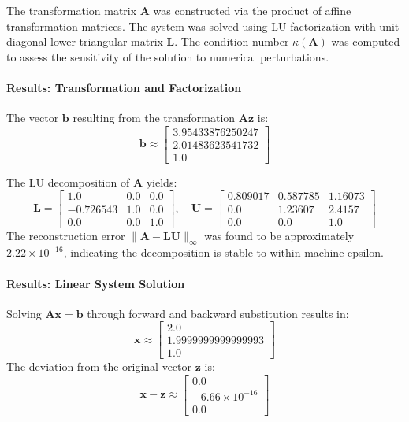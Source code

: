 \begin{solution}

	The transformation matrix $\mathbf{A}$ was constructed via the product of
	affine transformation matrices. The system was solved using LU factorization
	with unit-diagonal lower triangular matrix $\mathbf{L}$. The condition number
	$\kappa(\mathbf{A})$ was computed to assess the sensitivity of the solution to
	numerical perturbations.

	\paragraph{Results: Transformation and Factorization}
	The vector $\mathbf{b}$ resulting from the transformation
	$\mathbf{A}\mathbf{z}$ is:
	\[
		\mathbf{b} \approx \begin{bmatrix}
			3.95433876250247 \\
			2.01483623541732 \\
			1.0
		\end{bmatrix}
	\]

	The LU decomposition of $\mathbf{A}$ yields:
	\[
		\mathbf{L} = \begin{bmatrix}
			1.0       & 0.0 & 0.0 \\
			-0.726543 & 1.0 & 0.0 \\
			0.0       & 0.0 & 1.0
		\end{bmatrix}, \quad
		\mathbf{U} = \begin{bmatrix}
			0.809017 & 0.587785 & 1.16073 \\
			0.0      & 1.23607  & 2.4157  \\
			0.0      & 0.0      & 1.0
		\end{bmatrix}
	\]
	The reconstruction error $\|\mathbf{A} - \mathbf{LU}\|_{\infty}$ was found
	to be approximately $2.22 \times 10^{-16}$, indicating the decomposition is
	stable to within machine epsilon.

	\paragraph{Results: Linear System Solution}
	Solving $\mathbf{A}\mathbf{x} = \mathbf{b}$ through forward and backward
	substitution results in:
	\[
		\mathbf{x} \approx \begin{bmatrix}
			2.0                \\
			1.9999999999999993 \\
			1.0
		\end{bmatrix}
	\]
	The deviation from the original vector $\mathbf{z}$ is:
	\[
		\mathbf{x} - \mathbf{z} \approx \begin{bmatrix}
			0.0                   \\
			-6.66 \times 10^{-16} \\
			0.0
		\end{bmatrix}
	\]


\end{solution}
